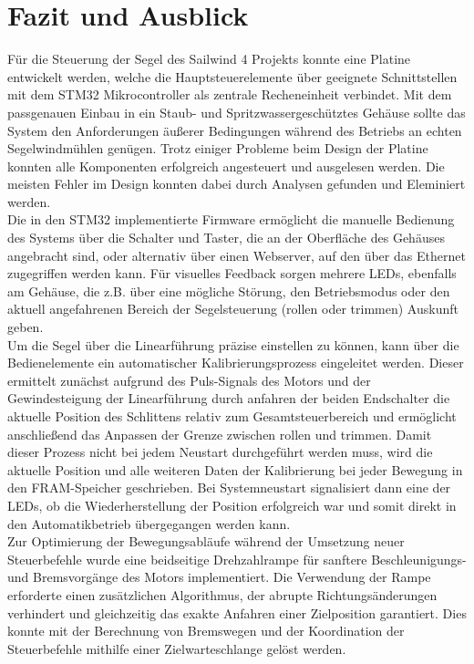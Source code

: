 \newpage
\section{Fazit und Ausblick}
Für die Steuerung der Segel des Sailwind 4 Projekts konnte eine Platine entwickelt werden, welche die Hauptsteuerelemente über geeignete Schnittstellen mit dem STM32 Mikrocontroller als zentrale Recheneinheit verbindet. Mit dem passgenauen Einbau in ein Staub- und Spritzwassergeschütztes Gehäuse sollte das System den Anforderungen äußerer Bedingungen während des Betriebs an echten Segelwindmühlen genügen. Trotz einiger Probleme beim Design der Platine konnten alle Komponenten erfolgreich angesteuert und ausgelesen werden. Die meisten Fehler im Design konnten dabei durch Analysen gefunden und Eleminiert werden.\\

\noindent
Die in den STM32 implementierte Firmware ermöglicht die manuelle Bedienung des Systems über die Schalter und Taster, die an der Oberfläche des Gehäuses angebracht sind, oder alternativ über einen Webserver, auf den über das Ethernet zugegriffen werden kann. Für visuelles Feedback sorgen mehrere LEDs, ebenfalls am Gehäuse, die z.B. über eine mögliche Störung, den Betriebsmodus oder den aktuell angefahrenen Bereich der Segelsteuerung (rollen oder trimmen) Auskunft geben. \\

\noindent
Um die Segel über die Linearführung präzise einstellen zu können, kann über die Bedienelemente ein automatischer Kalibrierungsprozess eingeleitet werden. Dieser ermittelt zunächst aufgrund des Puls-Signals des Motors und der Gewindesteigung der Linearführung durch anfahren der beiden Endschalter die aktuelle Position des Schlittens relativ zum Gesamtsteuerbereich und ermöglicht anschließend das Anpassen der Grenze zwischen rollen und trimmen. Damit dieser Prozess nicht bei jedem Neustart durchgeführt werden muss, wird die aktuelle Position und alle weiteren Daten der Kalibrierung bei jeder Bewegung in den FRAM-Speicher geschrieben. Bei Systemneustart signalisiert dann eine der LEDs, ob die Wiederherstellung der Position erfolgreich war und somit direkt in den Automatikbetrieb übergegangen werden kann. \\

\noindent
Zur Optimierung der Bewegungsabläufe während der Umsetzung neuer Steuerbefehle wurde eine beidseitige Drehzahlrampe für sanftere Beschleunigungs- und Bremsvorgänge des Motors implementiert. Die Verwendung der Rampe erforderte einen zusätzlichen Algorithmus, der abrupte Richtungsänderungen verhindert und gleichzeitig das exakte Anfahren einer Zielposition garantiert. Dies konnte mit der Berechnung von Bremswegen und der Koordination der Steuerbefehle mithilfe einer Zielwarteschlange gelöst werden.

